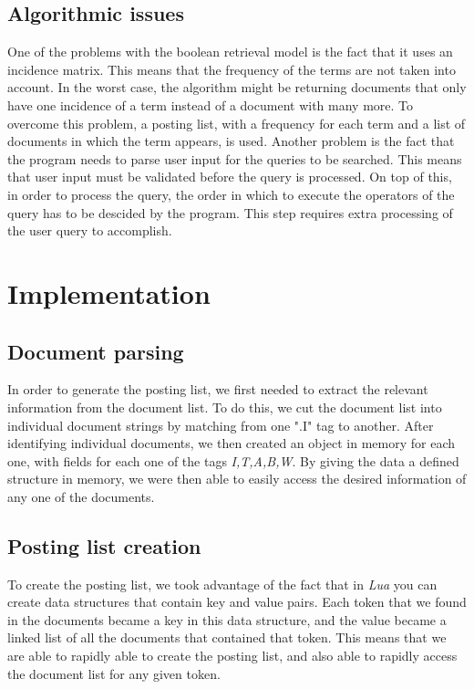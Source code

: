 \documentclass{article}
\begin{document}
\subsection{Algorithmic issues}
One of the problems with the boolean retrieval model is the fact that it uses an incidence matrix. This means that the frequency of the terms are not taken into account. In the worst case, the algorithm might be returning documents that only have one incidence of a term instead of a document with many more.
To overcome this problem, a posting list, with a frequency for each term and a list of documents in which the term appears, is used. Another problem is the fact that the program needs to parse user input for the queries to be searched. This means that user input must be validated before the query is processed.
On top of this, in order to process the query, the order in which to execute the operators of the query has to be descided by the program. This step requires extra processing of the user query to accomplish.

\section{Implementation}

\subsection*{Document parsing}
In order to generate the posting list, we first needed to extract the relevant information from the document list. To do this, we cut the document list into individual document strings by matching from one ".I" tag to another. After identifying individual documents, we then created an object in memory for each one, with fields for each one of the tags \textit{I,T,A,B,W}. By giving the data a defined structure in memory, we were then able to easily access the desired information of any one of the documents.

\subsection*{Posting list creation}
To create the posting list, we took advantage of the fact that in \textit{Lua} you can create data structures that contain key and value pairs. Each token that we found in the documents became a key in this data structure, and the value became a linked list of all the documents that contained that token. This means that we are able to rapidly able to create the posting list, and also able to rapidly access the document list for any given token.
\end{document}
